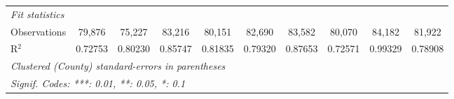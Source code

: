 \documentclass[letterpaper]{article}
\begin{document}
\begin{table}[H]
{\begin{tabular}{lccccccccc}
   \midrule
   \emph{Fit statistics}\\
   Observations         & 79,876                         & 75,227                        & 83,216                          & 80,151                          & 82,690                    & 83,582                        & 80,070                   & 84,182                  & 81,922\\  
   R$^2$                & 0.72753                        & 0.80230                       & 0.85747                         & 0.81835                         & 0.79320                   & 0.87653                       & 0.72571                  & 0.99329                 & 0.78908\\  
  
   \midrule \midrule
   \multicolumn{10}{l}{\emph{Clustered (County) standard-errors in parentheses}}\\
   \multicolumn{10}{l}{\emph{Signif. Codes: ***: 0.01, **: 0.05, *: 0.1}}\\
\end{tabular}}

\end{table}


\end{document}
